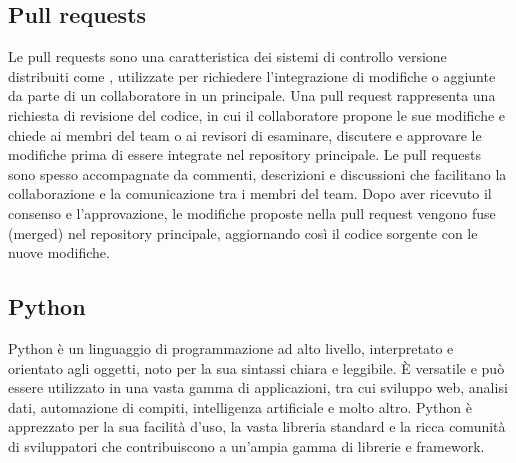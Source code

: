 \vspace{2em}
\subsection*{Pull requests}
Le pull requests sono una caratteristica dei sistemi di controllo versione distribuiti come , utilizzate per richiedere l'integrazione di modifiche o aggiunte da parte di un collaboratore in un  principale. Una pull request rappresenta una richiesta di revisione del codice, in cui il collaboratore propone le sue modifiche e chiede ai membri del team o ai revisori di esaminare, discutere e approvare le modifiche prima di essere integrate nel repository principale. Le pull requests sono spesso accompagnate da commenti, descrizioni e discussioni che facilitano la collaborazione e la comunicazione tra i membri del team. Dopo aver ricevuto il consenso e l'approvazione, le modifiche proposte nella pull request vengono fuse (merged) nel repository principale, aggiornando così il codice sorgente con le nuove modifiche.

\vspace{2em}
\subsection*{Python}
Python è un linguaggio di programmazione ad alto livello, interpretato e orientato agli oggetti, noto per la sua sintassi chiara e leggibile. È versatile e può essere utilizzato in una vasta gamma di applicazioni, tra cui sviluppo web, analisi dati, automazione di compiti, intelligenza artificiale e molto altro. Python è apprezzato per la sua facilità d'uso, la vasta libreria standard e la ricca comunità di sviluppatori che contribuiscono a un'ampia gamma di librerie e framework.
